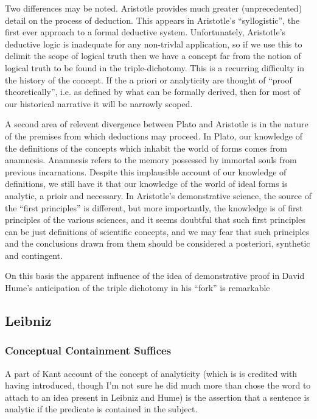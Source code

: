\documentclass[10pt,titlepage]{article}
\begin{document}
Two differences may be noted.
Aristotle provides much greater (unprecedented) detail on the process of deduction.
This appears in Aristotle's ``syllogistic'', the first ever approach to a formal deductive system.
Unfortunately, Aristotle's deductive logic is inadequate for any non-trivlal application, so if we use this to delimit the scope of logical truth then we have a concept far from the notion of logical truth to be found in the triple-dichotomy.
This is a recurring difficulty in the history of the concept.
If the a priori or analyticity are thought of ``proof theoretically'', i.e. as defined by what can be formally derived, then for most of our historical narrative it will be narrowly scoped.

A second area of relevent divergence between Plato and Aristotle is in the nature of the premises from which deductions may proceed.
In Plato, our knowledge of the definitions of the concepts which inhabit the world of forms comes from anamnesis.
Anamnesis refers to the memory possessed by immortal souls from previous incarnations.
Despite this implausible account of our knowledge of definitions, we still have it that our knowledge of the world of ideal forms is analytic, a prioir and necessary.
In Aristotle's demonstrative science, the source of the ``first principles'' is different, but more importantly, the knowledge is of first principles of the various sciences, and it seems doubtful that such first principles can be just definitions of scientific concepts, and we may fear that such principles and the conclusions drawn from them should be considered a posteriori, synthetic and contingent.

On this basis the apparent influence of the idea of demonstrative proof in David Hume's anticipation of the triple dichotomy in his ``fork'' is remarkable


\subsection{Leibniz}



\subsubsection{Conceptual Containment Suffices}

A part of Kant account of the concept of analyticity (which is is credited with having introduced, though I'm not sure he did much more than chose the word to attach to an idea present in Leibniz and Hume) is the assertion that a sentence is analytic if the predicate is contained in the subject.
\end{document}
